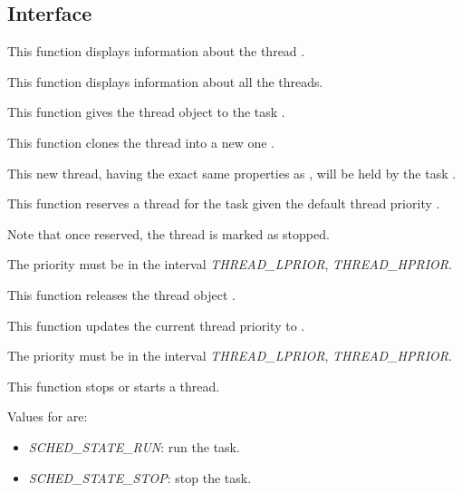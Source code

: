 \subsection*{Interface}

	 {
	   This function displays information about the thread .
	 }

	 {
	   This function displays information about all the threads.
	 }

	 {
	   This function gives the thread object  to the
	   task .
	 }

	 {
	   This function clones the thread  into a new one
	   .

	   This new thread, having the exact same properties as ,
	   will be held by the task .
	 }

	 {
	   This function reserves a thread for the task 
	   given the default thread priority .

	   Note that once reserved, the thread is marked as stopped.

	   The priority must be in the interval \emph{THREAD\_LPRIOR},
	   \emph{THREAD\_HPRIOR}.
	 }

	 {
	   This function releases the thread object .
	 }

	 {
	   This function updates the current thread priority
	   to .

	   The priority must be in the interval \emph{THREAD\_LPRIOR},
	   \emph{THREAD\_HPRIOR}.
	 }

	 {
	   This function stops or starts a thread.

	   Values for  are:

	   \begin{itemize}
	     \item
	       \emph{SCHED\_STATE\_RUN}: run the task.
	     \item
	       \emph{SCHED\_STATE\_STOP}: stop the task.
	   \end{itemize}
	 }

